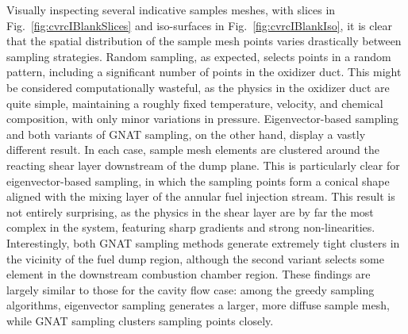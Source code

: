 Visually inspecting several indicative samples meshes, with slices in Fig.~\ref{fig:cvrcIBlankSlices} and iso-surfaces in Fig.~\ref{fig:cvrcIBlankIso}, it is clear that the spatial distribution of the sample mesh points varies drastically between sampling strategies. Random sampling, as expected, selects points in a random pattern, including a significant number of points in the oxidizer duct. This might be considered computationally wasteful, as the physics in the oxidizer duct are quite simple, maintaining a roughly fixed temperature, velocity, and chemical composition, with only minor variations in pressure. Eigenvector-based sampling and both variants of GNAT sampling, on the other hand, display a vastly different result. In each case, sample mesh elements are clustered around the reacting shear layer downstream of the dump plane. This is particularly clear for eigenvector-based sampling, in which the sampling points form a conical shape aligned with the mixing layer of the annular fuel injection stream. This result is not entirely surprising, as the physics in the shear layer are by far the most complex in the system, featuring sharp gradients and strong non-linearities. Interestingly, both GNAT sampling methods generate extremely tight clusters in the vicinity of the fuel dump region, although the second variant selects some element in the downstream combustion chamber region. These findings are largely similar to those for the cavity flow case: among the greedy sampling algorithms, eigenvector sampling generates a larger, more diffuse sample mesh, while GNAT sampling clusters sampling points closely. 

